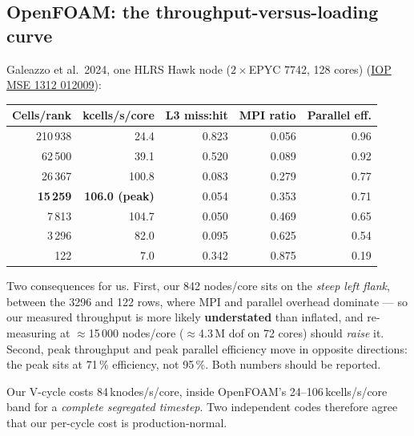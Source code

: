 \documentclass[11pt,a4paper]{article}
\begin{document}
\subsection{OpenFOAM: the throughput-versus-loading curve}
Galeazzo et al.\ 2024, one HLRS Hawk node ($2\times$EPYC 7742, 128 cores)
(\href{https://iopscience.iop.org/article/10.1088/1757-899X/1312/1/012009}{IOP MSE 1312 012009}):
\begin{center}
\begin{tabular}{@{}rrrrr@{}}
\toprule
Cells/rank & kcells/s/core & L3 miss:hit & MPI ratio & Parallel eff. \\
\midrule
210\,938 & 24.4 & 0.823 & 0.056 & 0.96 \\
62\,500 & 39.1 & 0.520 & 0.089 & 0.92 \\
26\,367 & 100.8 & 0.083 & 0.279 & 0.77 \\
\textbf{15\,259} & \textbf{106.0 (peak)} & 0.054 & 0.353 & 0.71 \\
7\,813 & 104.7 & 0.050 & 0.469 & 0.65 \\
3\,296 & 82.0 & 0.095 & 0.625 & 0.54 \\
122 & 7.0 & 0.342 & 0.875 & 0.19 \\
\bottomrule
\end{tabular}
\end{center}
Two consequences for us. First, our 842 nodes/core sits on the \emph{steep left flank},
between the 3296 and 122 rows, where MPI and parallel overhead dominate --- so our measured
throughput is more likely \textbf{understated} than inflated, and re-measuring at
$\approx$15\,000 nodes/core ($\approx$4.3\,M dof on 72 cores) should \emph{raise} it. Second,
peak throughput and peak parallel efficiency move in opposite directions: the peak sits at
71\,\% efficiency, not 95\,\%. Both numbers should be reported.

Our V-cycle costs 84\,knodes/s/core, inside OpenFOAM's 24--106\,kcells/s/core band for a
\emph{complete segregated timestep}. Two independent codes therefore agree that our per-cycle
cost is production-normal.
\end{document}
